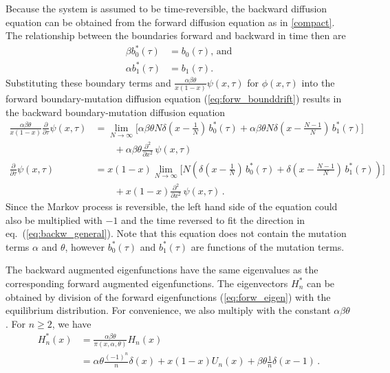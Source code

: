 \documentclass[preprint]{elsarticle}
\begin{document}
Because the system is assumed to be time-reversible, the backward diffusion equation can be obtained from the forward diffusion equation as in \eqref{compact}. The relationship between the boundaries forward and backward in time then are
\begin{equation}
\begin{split}
\beta b_0^{*}(\tau)&= b_0(\tau), \,\text{and}\\ 
\alpha b_1^{*}(\tau)&=b_1(\tau).
\end{split}
\end{equation}
Substituting these boundary terms and  $\tfrac{\alpha\beta\theta}{x(1-x)}\psi(x,\tau)$ for $\phi(x,\tau)$ into the forward boundary-mutation diffusion equation (\ref{eq:forw_bounddrift}) results in the backward boundary-mutation diffusion equation
\begin{equation}\label{eq:back_bounddrift}
\begin{split}
\frac{\alpha\beta\theta}{x(1-x)}\frac{\partial}{\partial \tau} \psi(x,\tau)&=
     \lim_{N\to\infty}\bigg[{\alpha\beta\theta}N\delta(x-\tfrac1N)\,b_0^{*}(\tau)  
    +{\alpha\beta\theta}N\delta(x-\tfrac{N-1}N) \,b_1^{*}(\tau)\bigg]\\
    &\qquad+{\alpha\beta\theta}\frac{\partial^2}{\partial x^2}\,\psi(x,\tau)\\
\frac{\partial}{\partial \tau} \psi(x,\tau)&=x(1-x)
     \lim_{N\to\infty}\bigg[N\left(\delta(x-\tfrac1N)\,b_0^{*}(\tau) +\delta(x-\tfrac{N-1}N) \,b_1^{*}(\tau)\right)\bigg]\\
    &\qquad+x(1-x)\frac{\partial^2}{\partial x^2}\,\psi(x,\tau)\,.
\end{split}
\end{equation}
Since the Markov process is reversible, the left hand side of the equation could also be multiplied with $-1$ and the time reversed to fit the direction in eq.~(\ref{eq:backw_general}). Note that this equation does not contain the mutation terms $\alpha$ and $\theta$, however $b_0^{*}(\tau)$ and $b_1^{*}(\tau)$ are functions of the mutation terms. 

The backward augmented eigenfunctions have the same eigenvalues as the corresponding forward augmented eigenfunctions. The eigenvectors $H_n^{*}$ can be obtained by division of the forward eigenfunctions (\ref{eq:forw_eigen}) with the equilibrium distribution. 
For convenience, we also multiply with the constant ${\alpha\beta\theta}$. For $n\geq 2$, we have
\begin{equation}\label{eq:backw_eigen}
\begin{split}
    H_n^{*}(x)&= \frac{\alpha\beta\theta}{\pi(x, \alpha, \theta)} H_n(x)\\
    &=\alpha\theta\tfrac{(-1)^n}{ n}\delta(x)+x(1-x)U_n(x)+\beta\theta\tfrac{1}{n}\delta(x-1)\,.
\end{split}
\end{equation}
\end{document}
